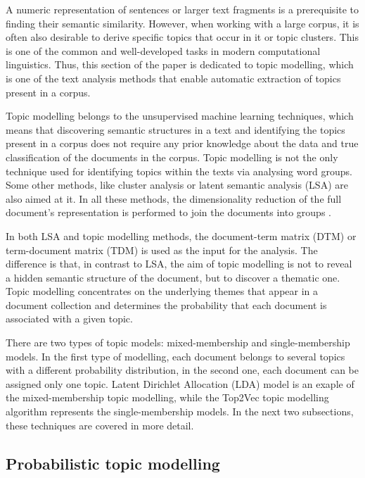 \documentclass[fontsize=12pt,a4paper,twoside,openany]{scrbook}
\begin{document}
A numeric representation of sentences or larger text fragments is a prerequisite to finding their semantic similarity. However, when working with a large corpus, it is often also desirable to derive specific topics that occur in it or topic clusters. This is one of the common and well-developed tasks in modern computational linguistics. Thus, this section of the paper is dedicated to topic modelling, which is one of the text analysis methods that enable automatic extraction of topics present in a corpus.

Topic modelling belongs to the unsupervised machine learning techniques, which means that discovering semantic structures in a text and identifying the topics present in a corpus does not require any prior knowledge about the data and true classification of the documents in the corpus. Topic modelling is not the only technique used for identifying topics within the texts via analysing word groups. Some other methods, like cluster analysis or latent semantic analysis (LSA) \parencite[see][]{Foltz96, Landauer2007} are also aimed at it. In all these methods, the dimensionality reduction of the full document's representation is performed to join the documents into groups \parencite{Anandarajan18}. 

In both LSA and topic modelling methods, the document-term matrix (DTM) or term-document matrix (TDM) is used as the input for the analysis. The difference is that, in contrast to LSA, the aim of topic modelling is not to reveal a hidden semantic structure of the document, but to discover a thematic one. Topic modelling concentrates on the underlying themes that appear in a document collection and determines the probability that each document is associated with a given topic. 

There are two types of topic models: mixed-membership and single-membership models. In the first type of modelling, each document belongs to several topics with a different probability distribution, in the second one, each document can be assigned only one topic. Latent Dirichlet Allocation (LDA) model is an exaple of the mixed-membership topic modelling, while the Top2Vec topic modelling algorithm represents the single-membership models. In the next two subsections, these techniques are covered in more detail.

\subsection{Probabilistic topic modelling}
\label{sec:lda}
\end{document}
